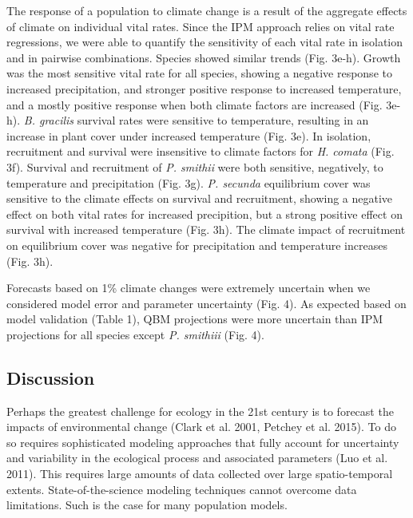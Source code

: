 \documentclass[12pt,]{article}
\begin{document}
The response of a population to climate change is a result of the
aggregate effects of climate on individual vital rates. Since the IPM
approach relies on vital rate regressions, we were able to quantify the
sensitivity of each vital rate in isolation and in pairwise
combinations. Species showed similar trends (Fig. 3e-h). Growth was the
most sensitive vital rate for all species, showing a negative response
to increased precipitation, and stronger positive response to increased
temperature, and a mostly positive response when both climate factors
are increased (Fig. 3e-h). \emph{B. gracilis} survival rates were
sensitive to temperature, resulting in an increase in plant cover under
increased temperature (Fig. 3e). In isolation, recruitment and survival
were insensitive to climate factors for \emph{H. comata} (Fig. 3f).
Survival and recruitment of \emph{P. smithii} were both sensitive,
negatively, to temperature and precipitation (Fig. 3g). \emph{P.
secunda} equilibrium cover was sensitive to the climate effects on
survival and recruitment, showing a negative effect on both vital rates
for increased precipition, but a strong positive effect on survival with
increased temperature (Fig. 3h). The climate impact of recruitment on
equilibrium cover was negative for precipitation and temperature
increases (Fig. 3h).

Forecasts based on 1\% climate changes were extremely uncertain when we
considered model error and parameter uncertainty (Fig. 4). As expected
based on model validation (Table 1), QBM projections were more uncertain
than IPM projections for all species except \emph{P. smithiii} (Fig. 4).

\subsection{Discussion}\label{discussion}

Perhaps the greatest challenge for ecology in the 21st century is to
forecast the impacts of environmental change (Clark et al. 2001, Petchey
et al. 2015). To do so requires sophisticated modeling approaches that
fully account for uncertainty and variability in the ecological process
and associated parameters (Luo et al. 2011). This requires large amounts
of data collected over large spatio-temporal extents.
State-of-the-science modeling techniques cannot overcome data
limitations. Such is the case for many population models.
\end{document}
